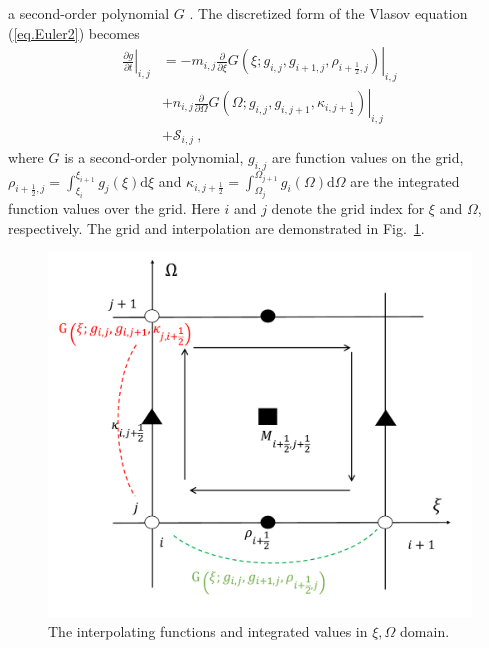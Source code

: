 a second-order  polynomial $G$ \cite{imadera2009}. 
The discretized form of the Vlasov equation (\ref{eq.Euler2}) becomes
\begin{equation}\label{eq.disV}
    \begin{aligned}
    \left.\frac{\partial g}{\partial t}\right|_{i,j}   & =  - m_{i,j} \left.\frac{\partial}{\partial \xi} G\left(\xi;g_{i,j},g_{i+1,j},\rho_{i+\frac{1}{2},j}\right)\right|_{i,j} 
    \\
    & + n_{i,j}  \left.\frac{\partial}{\partial \Omega}G\left(\Omega;g_{i,j},g_{i,j+1},\kappa_{i,j+\frac{1}{2}}\right)\right|_{i,j}
    \\
    & +  \mathcal{S}_{i,j}~,
    \end{aligned}
\end{equation}
where $G$ is a second-order  polynomial, $g_{i,j} $ are function values on the grid,  
$\rho_{i+\frac{1}{2},j}=\int_{\xi_i}^{\xi_{i+1}}g_{j}(\xi)\mathrm{d}\xi$ and $\kappa_{i,j+\frac{1}{2}}=\int_{\Omega_j}^{\Omega_{j+1}}g_{i}(\Omega)\mathrm{d}\Omega$
are the integrated function values over the grid.
Here $i$ and $j$ denote the grid index for $\xi$ and $\Omega$, respectively. 
The grid and interpolation are demonstrated in Fig.~\ref{fig.grids}.
\begin{figure}[htbp]
    \centering
    \includegraphics[scale=0.3]{cpc_img/IDO.pdf}
    \caption{The interpolating functions and  integrated values in $\xi,\Omega$ domain.}
    \label{fig.grids}
\end{figure}
